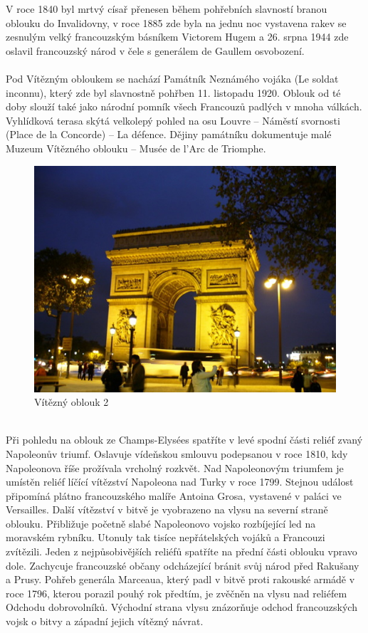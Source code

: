 V roce 1840 byl mrtvý císař přenesen během pohřebních slavností branou oblouku do Invalidovny, v roce 1885 zde byla na jednu noc vystavena rakev se zesnulým velký francouzským básníkem Victorem Hugem a 26. srpna 1944 zde oslavil francouzský národ v čele s generálem de Gaullem osvobození.\\
\\
Pod Vítězným obloukem se nachází Památník Neznámého vojáka (Le soldat inconnu), který zde byl slavnostně pohřben 11. listopadu 1920. Oblouk od té doby slouží také jako národní pomník všech Francouzů padlých v mnoha válkách. Vyhlídková terasa skýtá velkolepý pohled na osu Louvre – Náměstí svornosti (Place de la Concorde) – La défence. Dějiny památníku dokumentuje malé Muzeum Vítězného oblouku – Musée de l'Arc de Triomphe.\cite{lacko}\\
\begin{figure}[h!]
\centering
\includegraphics[scale=0.5]{images/obr2.jpg}
\caption{Vítězný oblouk 2}
\label{oblouk1}
\end{figure}
\\
Při pohledu na oblouk ze Champs-Elysées spatříte v levé spodní části reliéf zvaný Napoleonův triumf. Oslavuje vídeňskou smlouvu podepsanou v roce 1810, kdy Napoleonova říše prožívala vrcholný rozkvět. Nad Napoleonovým triumfem je umístěn reliéf líčící vítězství Napoleona nad Turky v roce 1799. Stejnou událost připomíná plátno francouzského malíře Antoina Grosa, vystavené v paláci ve Versailles. Další vítězství v bitvě je vyobrazeno na vlysu na severní straně oblouku. Přibližuje početně slabé Napoleonovo vojsko rozbíjející led na moravském rybníku. Utonuly tak tisíce nepřátelských vojáků a Francouzi zvítězili. Jeden z nejpůsobivějších reliéfů spatříte na přední části oblouku vpravo dole. Zachycuje francouzské občany odcházející bránit svůj národ před Rakušany a Prusy. Pohřeb generála Marceaua, který padl v bitvě proti rakouské armádě v roce 1796, kterou porazil pouhý rok předtím, je zvěčněn na vlysu nad reliéfem Odchodu dobrovolníků. Východní strana vlysu znázorňuje odchod francouzských vojsk o bitvy a západní jejich vítězný návrat.


